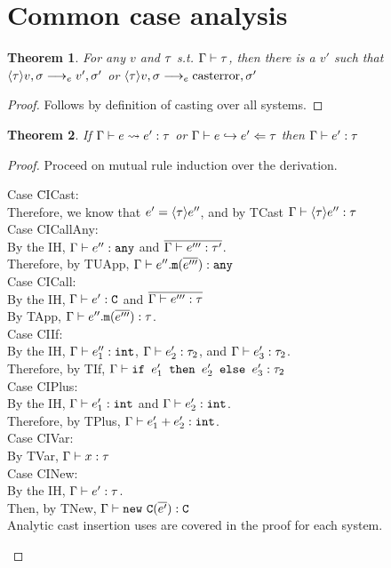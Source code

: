 \documentclass{report}
\newtheorem{thm}{Theorem}
\begin{document}
\section{Common case analysis}
\begin{thm} 
\label{castv}For any $v$ and $\tau$ s.t. $\Gamma\vdash \tau$, then there is a $v'$ such that $\langle \tau\rangle v,\sigma \longrightarrow_{e} v',\sigma'$ or $\langle \tau\rangle v,\sigma \longrightarrow_{e} \text{casterror},\sigma'$\end{thm}
\begin{proof}
Follows by definition of casting over all systems.
\end{proof}


\begin{thm} 
\label{cisnd}If $\Gamma\vdash e \rightsquigarrow e' : \tau$ or $\Gamma\vdash e\hookrightarrow e' \Leftarrow \tau$ then $\Gamma\vdash e' : \tau$\end{thm}
\begin{proof}
Proceed on mutual rule induction over the derivation.
\begin{tabbing}
Case \=CICast:\\
\> Therefore, we know that $e' = \langle \tau\rangle e''$, and by TCast $\Gamma\vdash \langle \tau\rangle e'' : \tau$\\
Case CICallAny:\\
\> By the IH, $\Gamma\vdash e'' : \texttt{any}$ and $\overline{ \Gamma\vdash e''' : \tau'} $.\\
\> Therefore, by TUApp, $\Gamma\vdash e''.\texttt{m}(\overline{ e'''} ) : \texttt{any}$\\
Case CICall:\\
\> By the IH, $\Gamma\vdash e' : \texttt{C}$ and $\overline{ \Gamma\vdash e''' : \tau} $\\
\> By TApp, $\Gamma\vdash e''.\texttt{m}(\overline{ e'''} ) : \tau$.\\
Case CIIf:\\
\> By the IH, $\Gamma\vdash e_1'' : \texttt{int}$, $\Gamma\vdash e_2' : \tau_2$, and $\Gamma\vdash e_3' : \tau_2$.\\
\> Therefore, by TIf, $\Gamma\vdash \texttt{if }e_1'\texttt{ then }e_2'\texttt{ else }e_3' : \tau_2$\\
Case CIPlus:\\
\> By the IH, $\Gamma\vdash e_1' : \texttt{int}$ and $\Gamma\vdash e_2' : \texttt{int}$.\\
\> Therefore, by TPlus, $\Gamma\vdash e_1' + e_2' : \texttt{int}$.\\
Case CIVar:\\
\> By TVar, $\Gamma\vdash x:\tau$\\
Case CINew:\\
\> By the IH, $\Gamma\vdash e' : \tau$.\\
\> Then, by TNew, $\Gamma\vdash  \texttt{new} ~ \texttt{C} ( \overline{ e'}  ) : \texttt{C}$ \\
Analytic cast insertion uses are covered in the proof for each system.\\
\end{tabbing}
\end{proof}
\end{document}
